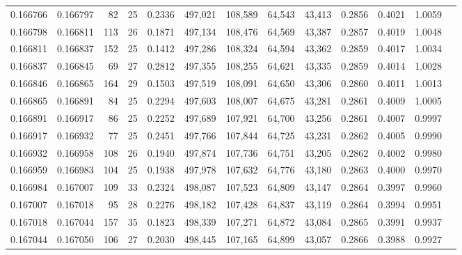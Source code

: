 \begin{tabular}{rrrrrrrrrrrrr}
0.166766 & 0.166797 &  82 &  25 &                                     0.2336 & 497,021 & 108,589 &  64,543 &  43,413 & 0.2856 & 0.4021 & 1.0059 \\
0.166798 & 0.166811 & 113 &  26 &                                     0.1871 & 497,134 & 108,476 &  64,569 &  43,387 & 0.2857 & 0.4019 & 1.0048 \\
0.166811 & 0.166837 & 152 &  25 &                                     0.1412 & 497,286 & 108,324 &  64,594 &  43,362 & 0.2859 & 0.4017 & 1.0034 \\
0.166837 & 0.166845 &  69 &  27 &                                     0.2812 & 497,355 & 108,255 &  64,621 &  43,335 & 0.2859 & 0.4014 & 1.0028 \\
0.166846 & 0.166865 & 164 &  29 &                                     0.1503 & 497,519 & 108,091 &  64,650 &  43,306 & 0.2860 & 0.4011 & 1.0013 \\
0.166865 & 0.166891 &  84 &  25 &                                     0.2294 & 497,603 & 108,007 &  64,675 &  43,281 & 0.2861 & 0.4009 & 1.0005 \\
0.166891 & 0.166917 &  86 &  25 &                                     0.2252 & 497,689 & 107,921 &  64,700 &  43,256 & 0.2861 & 0.4007 & 0.9997 \\
0.166917 & 0.166932 &  77 &  25 &                                     0.2451 & 497,766 & 107,844 &  64,725 &  43,231 & 0.2862 & 0.4005 & 0.9990 \\
0.166932 & 0.166958 & 108 &  26 &                                     0.1940 & 497,874 & 107,736 &  64,751 &  43,205 & 0.2862 & 0.4002 & 0.9980 \\
0.166959 & 0.166983 & 104 &  25 &                                     0.1938 & 497,978 & 107,632 &  64,776 &  43,180 & 0.2863 & 0.4000 & 0.9970 \\
0.166984 & 0.167007 & 109 &  33 &                                     0.2324 & 498,087 & 107,523 &  64,809 &  43,147 & 0.2864 & 0.3997 & 0.9960 \\
0.167007 & 0.167018 &  95 &  28 &                                     0.2276 & 498,182 & 107,428 &  64,837 &  43,119 & 0.2864 & 0.3994 & 0.9951 \\
0.167018 & 0.167044 & 157 &  35 &                                     0.1823 & 498,339 & 107,271 &  64,872 &  43,084 & 0.2865 & 0.3991 & 0.9937 \\
0.167044 & 0.167050 & 106 &  27 &                                     0.2030 & 498,445 & 107,165 &  64,899 &  43,057 & 0.2866 & 0.3988 & 0.9927 \\

\end{tabular}
